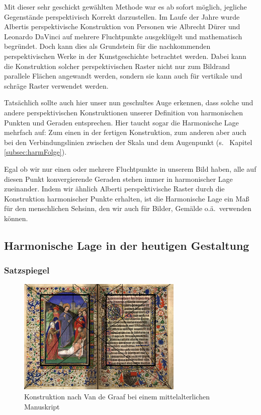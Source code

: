 \documentclass[12pt,a4paper]{article}
\begin{document}
Mit dieser sehr geschickt gewählten Methode war es ab sofort möglich, jegliche Gegenstände perspektivisch Korrekt darzustellen. Im Laufe der Jahre wurde Albertis perspektivische Konstruktion von Personen wie Albrecht Dürer und Leonardo DaVinci auf mehrere Fluchtpunkte ausgeklügelt und mathematisch begründet. Doch kann dies als Grundstein für die nachkommenden perspektivischen Werke in der Kunstgeschichte betrachtet werden. Dabei kann die Konstruktion solcher perspektivischen Raster nicht nur zum Bildrand parallele Flächen angewandt werden, sondern sie kann auch für vertikale und schräge Raster verwendet werden.


Tatsächlich sollte auch hier unser nun geschultes Auge erkennen, dass solche und andere perspektivischen Konstruktionen unserer Definition von harmonischen Punkten und Geraden entsprechen. Hier taucht sogar die Harmonische Lage mehrfach auf: Zum einen in der fertigen Konstruktion, zum anderen aber auch bei den Verbindungslinien zwischen der Skala und dem Augenpunkt (s.~ Kapitel \ref{subsec:harmFolge}).

Egal ob wir nur einen oder mehrere Fluchtpunkte in unserem Bild haben, alle auf diesen Punkt konvergierende Geraden stehen immer in harmonischer Lage zueinander. Indem wir ähnlich Alberti perspektivische Raster durch die Konstruktion harmonischer Punkte erhalten, ist die Harmonische Lage ein Maß für den menschlichen Sehsinn, den wir auch für Bilder, Gemälde o.ä.~verwenden können.

\newpage
\subsection{Harmonische Lage in der heutigen Gestaltung}

\subsubsection{Satzspiegel}

\begin{figure}[htbp]
\centering
\includegraphics[width=0.7\textwidth]{Bilder/oldManus.jpg}
\caption{Konstruktion nach Van de Graaf bei einem mittelalterlichen Manuskript\protect\footnotemark[4]}
\label{fig:oldMan}
\end{figure}
\end{document}
